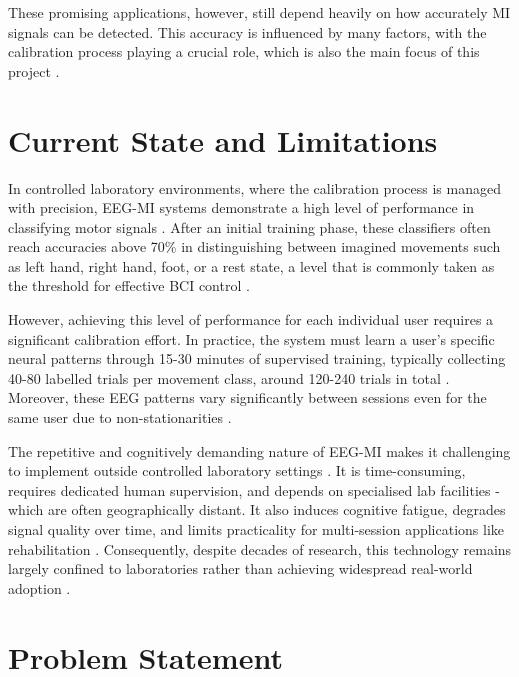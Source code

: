 \documentclass[a4paper, 11pt, openany]{report}
\let\cite\citep
\begin{document}
    These promising applications, however, still depend heavily on how accurately MI 
    signals can be detected. This accuracy is influenced by many factors, with the 
    calibration process playing a crucial role, which is also the 
    main focus of this project \cite{Lotte2018}.


    \section{Current State and Limitations}

    In controlled laboratory environments, where the calibration process is managed 
    with precision, EEG-MI systems demonstrate a high level of performance in classifying 
    motor signals \cite{Lotte2018}. After an initial training phase, these classifiers 
    often reach accuracies above 70\% in distinguishing between imagined movements such 
    as left hand, right hand, foot, or a rest state, a level that is commonly taken as 
    the threshold for effective BCI control \cite{Kübler2001}.

    However, achieving this level of performance for each individual user requires a 
    significant calibration effort. In practice, the system must learn a user's specific
    neural patterns through 15-30 minutes of supervised training, typically collecting
    40-80 labelled trials per movement class, around 120-240 trials in total \cite{Giles2022}. 
    Moreover, these EEG patterns vary significantly between sessions even for the same 
    user due to non-stationarities \cite{Sugiyama2008}.

    The repetitive and cognitively demanding nature of EEG-MI makes it challenging to 
    implement outside controlled laboratory settings \cite{Xu2024}. It is time-consuming, 
    requires dedicated human supervision, and depends on specialised lab facilities - which are
    often geographically distant. It also induces cognitive fatigue, degrades signal 
    quality over time, and limits practicality for multi-session applications like 
    rehabilitation \cite{Xu2024}. Consequently, despite decades of research, this 
    technology remains largely confined to laboratories rather than achieving 
    widespread real-world adoption \cite{Wolpaw2002}.


    \section{Problem Statement}
\end{document}
